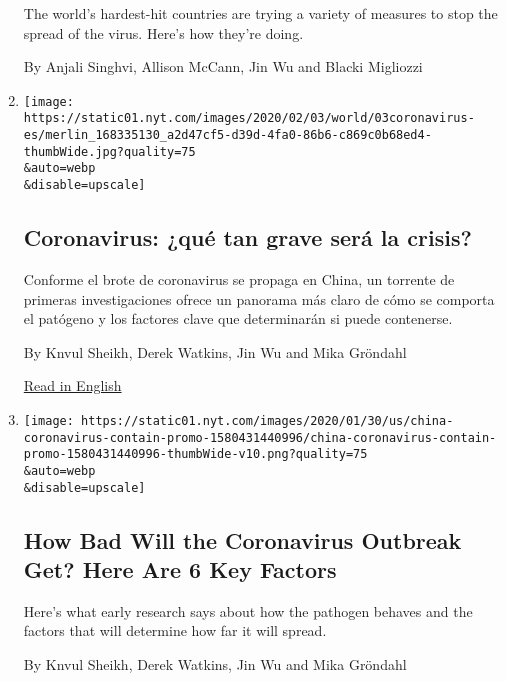 \begin{enumerate}
  The world's hardest-hit countries are trying a variety of measures to
  stop the spread of the virus. Here's how they're doing.

  By Anjali Singhvi, Allison McCann, Jin Wu and Blacki Migliozzi
\item
  \href{/es/2020/02/04/espanol/mundo/coronavirus-vacuna-viaje.html}{}

  \texttt{[image: https://static01.nyt.com/images/2020/02/03/world/03coronavirus-es/merlin\_168335130\_a2d47cf5-d39d-4fa0-86b6-c869c0b68ed4-thumbWide.jpg?quality=75\\\&auto=webp\\\&disable=upscale]}

  \hypertarget{coronavirus-quuxe9-tan-grave-seruxe1-la-crisis}{%
  \subsection{Coronavirus: ¿qué tan grave será la
  crisis?}\label{coronavirus-quuxe9-tan-grave-seruxe1-la-crisis}}

  Conforme el brote de coronavirus se propaga en China, un torrente de
  primeras investigaciones ofrece un panorama más claro de cómo se
  comporta el patógeno y los factores clave que determinarán si puede
  contenerse.

  By Knvul Sheikh, Derek Watkins, Jin Wu and Mika Gröndahl

  \href{https://www.nytimes.com/interactive/2020/world/asia/china-coronavirus-contain.html}{Read
  in English}
\item
  \href{/interactive/2020/world/asia/china-coronavirus-contain.html}{}

  \texttt{[image: https://static01.nyt.com/images/2020/01/30/us/china-coronavirus-contain-promo-1580431440996/china-coronavirus-contain-promo-1580431440996-thumbWide-v10.png?quality=75\\\&auto=webp\\\&disable=upscale]}

  \hypertarget{how-bad-will-the-coronavirus-outbreak-get-here-are-6-key-factors}{%
  \subsection{How Bad Will the Coronavirus Outbreak Get? Here Are 6 Key
  Factors}\label{how-bad-will-the-coronavirus-outbreak-get-here-are-6-key-factors}}

  Here's what early research says about how the pathogen behaves and the
  factors that will determine how far it will spread.

  By Knvul Sheikh, Derek Watkins, Jin Wu and Mika Gröndahl
\end{enumerate}

